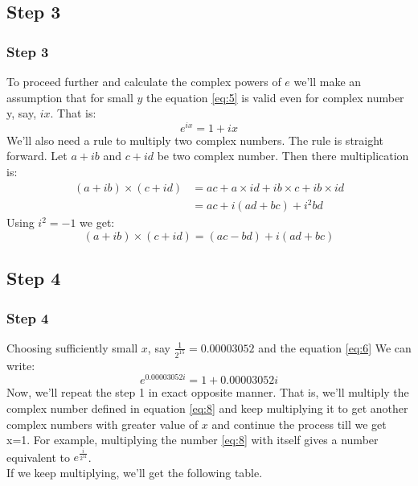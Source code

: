 \documentclass{beamer}
\begin{document}
\subsection{Step 3}
\begin{frame}
    \frametitle{Step 3}
    To proceed further and calculate the complex powers of $e$ we'll make an assumption that for small $y$ the equation \ref{eq:5} is valid even for complex number y, say, $ix$. That is:
    \begin{equation}
        \label{eq:6}
        e^{ix} = 1 + ix
    \end{equation}
    \pause
    We'll also need a rule to multiply two complex numbers. The rule is straight forward. Let $a+ib$ and $c+id$ be two complex number. Then there multiplication is:
    \begin{equation*}
        \begin{split}
            (a+ib)\times (c+id) &=ac + a\times id + ib\times c + ib\times id \\
            &=ac + i(ad+bc) + i^2bd
        \end{split}
    \end{equation*}
    Using $i^2 = -1$ we get:
    \begin{equation}
        \label{eq:7}
        (a+ib)\times (c+id) = (ac-bd) + i(ad+bc)
    \end{equation}
\end{frame}

\subsection{Step 4}
\begin{frame}
    \frametitle{Step 4}
    Choosing sufficiently small $x$, say $\frac{1}{2^{15}} = 0.00003052$ and the equation \ref{eq:6} We can write:
    \begin{equation}
        \label{eq:8}
        e^{0.00003052i} = 1 + 0.00003052i
    \end{equation}
    \pause
    Now, we'll repeat the step 1 in exact opposite manner. That is, we'll multiply the complex number defined in equation \ref{eq:8} and keep multiplying it to get another complex numbers with greater value of $x$ and continue the process till we get x=1. For example, multiplying the number \ref{eq:8} with itself gives a number equivalent to $e^{\frac{i}{2^{14}}}$. \\ If we keep multiplying, we'll get the following table.
\end{frame}
\end{document}
